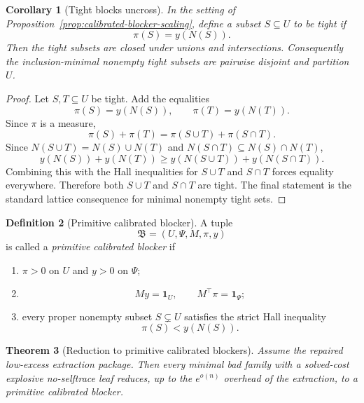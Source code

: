 \documentclass[11pt]{article}
\newtheorem{theorem}{Theorem}[section]
\newtheorem{corollary}[theorem]{Corollary}
\theoremstyle{definition}
\newtheorem{definition}[theorem]{Definition}
\newcommand{\1}{\mathbf{1}}
\begin{document}
\begin{corollary}[Tight blocks uncross]\label{cor:tight-blocks-uncross}
In the setting of Proposition~\ref{prop:calibrated-blocker-scaling}, define a subset $S\subseteq U$ to be \emph{tight} if
\[
\pi(S)=y(N(S)).
\]
Then the tight subsets are closed under unions and intersections. Consequently the inclusion-minimal nonempty tight subsets are pairwise disjoint and partition $U$.
\end{corollary}

\begin{proof}
Let $S,T\subseteq U$ be tight. Add the equalities
\[
\pi(S)=y(N(S)),
\qquad
\pi(T)=y(N(T)).
\]
Since $\pi$ is a measure,
\[
\pi(S)+\pi(T)=\pi(S\cup T)+\pi(S\cap T).
\]
Since $N(S\cup T)=N(S)\cup N(T)$ and $N(S\cap T)\subseteq N(S)\cap N(T)$,
\[
y(N(S))+y(N(T))
\ge
y(N(S\cup T))+y(N(S\cap T)).
\]
Combining this with the Hall inequalities for $S\cup T$ and $S\cap T$ forces equality everywhere. Therefore both $S\cup T$ and $S\cap T$ are tight. The final statement is the standard lattice consequence for minimal nonempty tight sets.
\end{proof}

\begin{definition}[Primitive calibrated blocker]\label{def:primitive-calibrated-blocker}
A tuple
\[
\mathfrak B=(U,\Psi,M,\pi,y)
\]
is called a \emph{primitive calibrated blocker} if
\begin{enumerate}[label=(\roman*),leftmargin=2.2em]
\item $\pi>0$ on $U$ and $y>0$ on $\Psi$;
\item
\[
My=\mathbf 1_U,
\qquad
M^\top \pi=\mathbf 1_\Psi;
\]
\item every proper nonempty subset $S\subsetneq U$ satisfies the strict Hall inequality
\[
\pi(S)<y(N(S)).
\]
\end{enumerate}
\end{definition}

\begin{theorem}[Reduction to primitive calibrated blockers]\label{thm:primitive-calibrated-blocker}
Assume the repaired low-excess extraction package. Then every minimal bad family with a solved-cost explosive no-selftrace leaf reduces, up to the $e^{o(n)}$ overhead of the extraction, to a primitive calibrated blocker.
\end{theorem}
\end{document}

